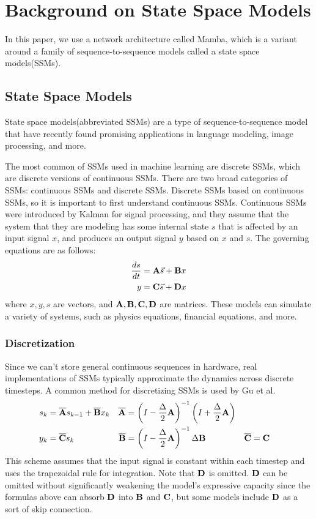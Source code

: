 
\section{Background on State Space Models}
In this paper, we use a network architecture called Mamba, which is a variant
around a family of sequence-to-sequence models called a state space
models(SSMs).

\subsection{State Space Models}
State space models(abbreviated SSMs) are a type of sequence-to-sequence model
that have recently found promising applications in language
modeling\cite{mamba}, image processing\cite{medmamba}, and more\cite{s4}.

The most common of SSMs used in machine learning are discrete SSMs, which are
discrete versions of continuous SSMs.
There are two broad categories of SSMs: continuous SSMs and discrete SSMs.
Discrete SSMs based on continuous SSMs, so it is important to first understand
continuous SSMs.
Continuous SSMs were introduced by Kalman\cite{kalman} for signal processing,
and they assume that the system that they are modeling has some internal state
$s$ that is affected by an input signal $x$, and produces an output signal $y$
based on $x$ and $s$.
The governing equations are as follows:
$$\begin{aligned}
    \frac{ds}{dt} &= {\mathbf{A}}\vec{s} + {\mathbf{B}} x \\
    y &= {\mathbf{C}}\vec{s} + {\mathbf{D}} x
\end{aligned}$$
where $x, y, s$ are vectors, and ${\mathbf{A}}, {\mathbf{B}}, {\mathbf{C}}, {\mathbf{D}}$ are matrices.
These models can simulate a variety of systems, such as physics equations,
financial equations, and more.

\subsubsection{Discretization}
Since we can't store general continuous sequences in hardware, real
implementations of SSMs typically approximate the dynamics across discrete
timesteps.
A common method for discretizing SSMs is used by Gu et al. \cite{s4}
$$\begin{aligned}
    s_k &= \overline {{\mathbf{A}}} s_{k-1} + \overline {{\mathbf{B}}} x_k
    &
    \overline {{\mathbf{A}}} &=
    \left(I - \frac{\Delta}{2}{\mathbf{A}}\right)^{-1}
    \left(I + \frac{\Delta}{2}{\mathbf{A}}\right)
    \\
    y_k &= \overline {{\mathbf{C}}} s_k
    &
    \overline {{\mathbf{B}}} &=
    \left(I - \frac{\Delta}{2}{\mathbf{A}}\right)^{-1}
    \Delta {\mathbf{B}}
    &
    \overline {{\mathbf{C}}} &= {\mathbf{C}}
\end{aligned}$$
This scheme assumes that the input signal is constant within each timestep and
uses the trapezoidal rule for integration.
Note that ${\mathbf{D}}$ is omitted. ${\mathbf{D}}$ can be omitted without significantly weakening
the model's expressive capacity since the formulas above can absorb ${\mathbf{D}}$ into
${\mathbf{B}}$ and ${\mathbf{C}}$, but some models include ${\mathbf{D}}$ as a sort of skip connection.

